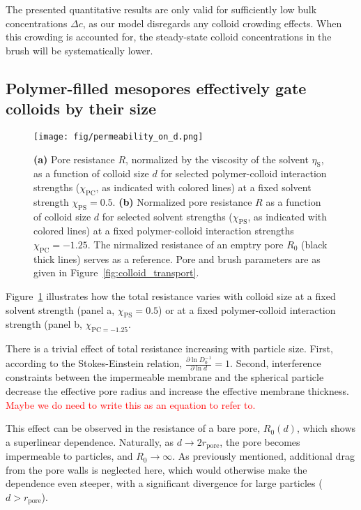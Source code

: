 \documentclass[12pt, a4paper]{article}
\newcommand\todo[1]{\textcolor{red}{#1}}
\begin{document}
The presented quantitative results are only valid for sufficiently low bulk concentrations $\Delta c$, as our model disregards any colloid crowding effects.
When this crowding is accounted for, the steady-state colloid concentrations in the brush will be systematically lower.


\subsection{Polymer-filled mesopores effectively gate colloids by their size}

\begin{figure}
    \centering
    \texttt{[image: fig/permeability\_on\_d.png]}
    \caption{
    \textbf{(a)} 
    Pore resistance $R$, normalized by the viscosity of the solvent $\eta_\text{S}$, as a function of colloid size $d$ for selected polymer-colloid interaction strengths ($\chi_{\text{PC}}$, as indicated with colored lines) at a fixed solvent strength $\chi_{\text{PS}} =0.5$.
    \textbf{(b)}
    Normalized pore resistance $R$ as a function of colloid size $d$ for selected solvent strengths ($\chi_{\text{PS}}$, as indicated with colored lines) at a fixed polymer-colloid interaction strengths $\chi_{\text{PC}} = -1.25$. 
    The nirmalized resistance of an emptry pore $R_{0}$ (black thick lines) serves as a reference.
    Pore and brush parameters are as given in Figure~\ref{fig:colloid_transport}. 
    }
    \label{fig:R_vs_d}
\end{figure}

Figure~\ref{fig:R_vs_d} illustrates how the total resistance varies with colloid size at a fixed solvent strength (panel a, $\chi_{\text{PS}} = 0.5$) or at a fixed polymer-colloid interaction strength (panel b, $\chi_{\text{PC} = -1.25}$.

There is a trivial effect of total resistance increasing with particle size. First, according to the Stokes-Einstein relation, $\frac{\partial \ln D_0^{-1}}{\partial \ln d} = 1$. Second, interference constraints between the impermeable membrane and the spherical particle decrease the effective pore radius and increase the effective membrane thickness.
\todo{Maybe we do need to write this as an equation to refer to.}

This effect can be observed in the resistance of a bare pore, $R_0(d)$, which shows a superlinear dependence.
Naturally, as $d \to 2r_{\text{pore}}$, the pore becomes impermeable to particles, and $R_0 \to \infty$.
As previously mentioned, additional drag from the pore walls is neglected here, which would otherwise make the dependence even steeper, with a significant divergence for large particles ($d > r_{\text{pore}}$).
\end{document}
